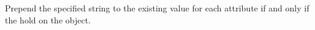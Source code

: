 Prepend the specified string to the existing value for each attribute if and
only if the  hold on the object.



